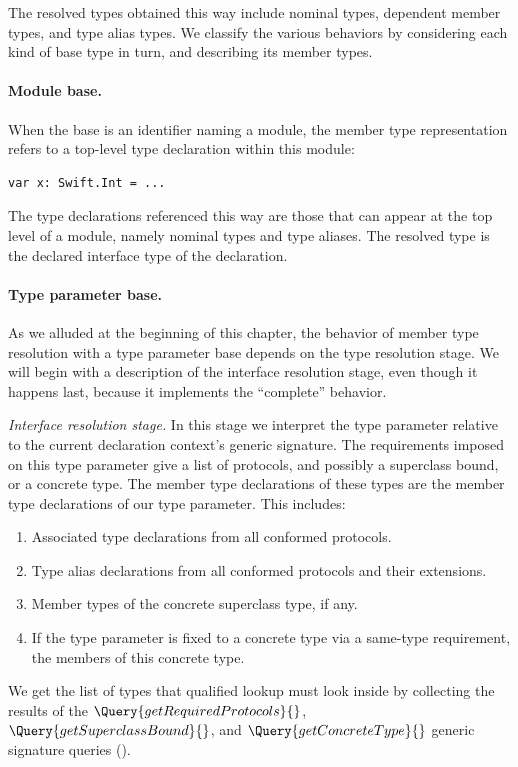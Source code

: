\documentclass[../generics]{subfiles}
\begin{document}
The resolved types obtained this way include nominal types, dependent member types, and type alias types. We classify the various behaviors by considering each kind of base type in turn, and describing its member types.

\paragraph{Module base.}
When the base is an identifier naming a module, the member type representation refers to a top-level type declaration within this module:
\begin{Verbatim}
var x: Swift.Int = ...
\end{Verbatim}
The type declarations referenced this way are those that can appear at the top level of a module, namely nominal types and type aliases. The resolved type is the declared interface type of the declaration.

\paragraph{Type parameter base.}
As we alluded at the beginning of this chapter, the behavior of member type resolution with a type parameter base depends on the type resolution stage. We will begin with a description of the interface resolution stage, even though it happens last, because it implements the ``complete'' behavior.

\smallskip

\emph{Interface resolution stage.} In this stage we interpret the type parameter relative to the current declaration context's generic signature. The requirements imposed on this type parameter give a list of protocols, and possibly a superclass bound, or a concrete type. The member type declarations of these types are the member type declarations of our type parameter. This includes:
\begin{enumerate}
\item Associated type declarations from all conformed protocols.
\item Type alias declarations from all conformed protocols and their extensions.
\item Member types of the concrete superclass type, if any.
\item If the type parameter is fixed to a concrete type via a same-type requirement, the members of this concrete type.
\end{enumerate}
We get the list of types that qualified lookup must look inside by collecting the results of the $\Query{getRequiredProtocols}{}$, $\Query{getSuperclassBound}{}$, and $\Query{getConcreteType}{}$ generic signature queries ().
\end{document}
